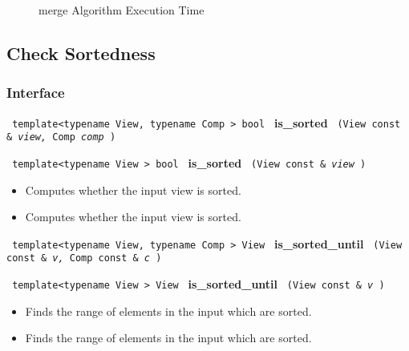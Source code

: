 \begin{figure}[p]
\caption{merge Algorithm Execution Time}
\label{fig:merge-alg-exec-exper}
\end{figure}

 
\subsection{Check Sortedness} \label{sec-sort-is_sorted}

\subsubsection{Interface} %

\noindent
\texttt{%
template<typename View, typename Comp >
\newline
bool 
}
\newline
\textbf{is\_sorted}%
\texttt{%
(View const \&
\textit{view,}%
Comp 
\textit{comp}%
)
}
\vspace{0.4cm}

\noindent
\texttt{%
template<typename View >
\newline
bool 
}
\newline
\textbf{is\_sorted}%
\texttt{%
(View const \&
\textit{view}%
)
}

\begin{itemize}
\item
Computes whether the input view is sorted. 
\item
Computes whether the input view is sorted. 
\end{itemize}
 
\noindent
\texttt{%
template<typename View, typename Comp >
\newline
View 
}
\newline
\textbf{is\_sorted\_until}%
\texttt{%
(View const \&
\textit{v,}%
Comp const \&
\textit{c}%
)
}
\vspace{0.4cm}

\noindent
\texttt{%
template<typename View >
\newline
View 
}
\newline
\textbf{is\_sorted\_until}%
\texttt{%
(View const \&
\textit{v}%
)
}

\begin{itemize}
\item
Finds the range of elements in the input which are sorted. 
\item
Finds the range of elements in the input which are sorted. 
\end{itemize}

